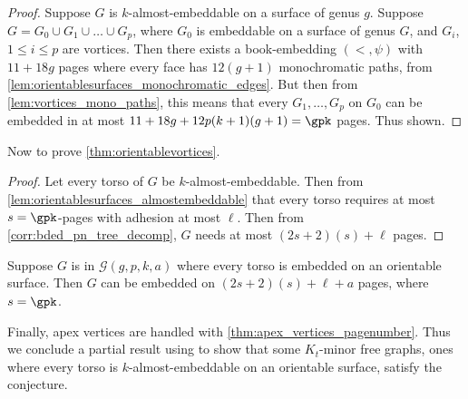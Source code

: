 \begin{proof}
	Suppose $G$ is $k$-almost-embeddable on a surface of genus $g$. Suppose $G = G_0 \cup G_1 \cup \ldots \cup G_p$, where $G_0$ is embeddable on a surface of genus $G$, and $G_i$, $1 \leq i \leq p$ are vortices. Then there exists a book-embedding $(<, \psi)$ with $11 + 18g$ pages where every face has $12(g+1)$ monochromatic paths, from \cref{lem:orientablesurfaces_monochromatic_edges}. But then from \cref{lem:vortices_mono_paths}, this means that every $G_1, \ldots, G_p$ on $G_0$ can be embedded in at most $11 + 18g + 12p(k + 1)(g + 1) = \gpk $ pages. Thus shown.
\end{proof}

Now to prove \cref{thm:orientablevortices}. 
\begin{proof}
	Let every torso of $G$ be $k$-almost-embeddable. Then from \cref{lem:orientablesurfaces_almostembeddable} that every torso requires at most $s = \gpk $-pages with adhesion at most $\ell$. Then from \cref{corr:bded_pn_tree_decomp}, $G$ needs at most $(2s + 2)(s) + \ell$ pages.
\end{proof}


\begin{corollary}
	Suppose $G$ is in $\mathcal{G}(g, p, k, a)$ where every torso is embedded on an orientable surface. Then $G$ can be embedded on $(2s + 2)(s) + \ell + a$ pages, where $s = \gpk$. 
\end{corollary}
Finally, apex vertices are handled with \cref{thm:apex_vertices_pagenumber}. Thus we conclude a partial result using \textcite{robertsonGraphMinorsXVI2003} to show that some $K_t$-minor free graphs, ones where every torso is $k$-almost-embeddable on an orientable surface, satisfy the conjecture.